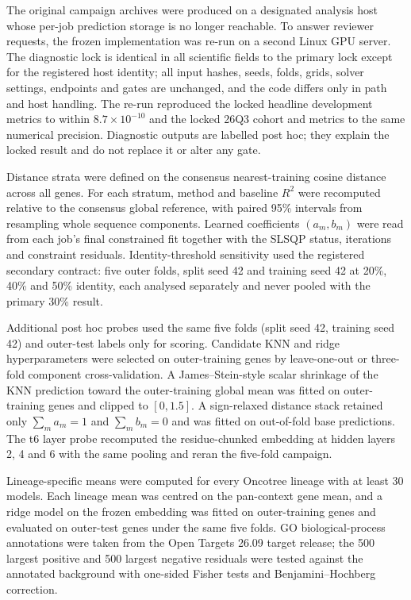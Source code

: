 \documentclass[11pt]{article}
\begin{document}
The original campaign archives were produced on a designated analysis host whose
per-job prediction storage is no longer reachable. To answer reviewer requests,
the frozen implementation was re-run on a second Linux GPU server. The diagnostic
lock is identical in all scientific fields to the primary lock except for the
registered host identity; all input hashes, seeds, folds, grids, solver settings,
endpoints and gates are unchanged, and the code differs only in path and host
handling. The re-run reproduced the locked headline development metrics to
within $8.7\times10^{-10}$ and the locked 26Q3 cohort and metrics to the same
numerical precision. Diagnostic outputs are labelled post hoc; they explain the
locked result and do not replace it or alter any gate.

Distance strata were defined on the consensus nearest-training cosine distance
across all genes. For each stratum, method and baseline $R^2$ were recomputed
relative to the consensus global reference, with paired 95\% intervals from
resampling whole sequence components. Learned coefficients $(a_m,b_m)$ were read
from each job's final constrained fit together with the SLSQP status, iterations
and constraint residuals. Identity-threshold sensitivity used the registered
secondary contract: five outer folds, split seed 42 and training seed 42 at
20\%, 40\% and 50\% identity, each analysed separately and never pooled with the
primary 30\% result.

Additional post hoc probes used the same five folds (split seed 42, training
seed 42) and outer-test labels only for scoring. Candidate KNN and ridge
hyperparameters were selected on outer-training genes by leave-one-out or
three-fold component cross-validation. A James--Stein-style scalar shrinkage of
the KNN prediction toward the outer-training global mean was fitted on
outer-training genes and clipped to $[0,1.5]$. A sign-relaxed distance stack
retained only $\sum_m a_m=1$ and $\sum_m b_m=0$ and was fitted on out-of-fold
base predictions. The t6 layer probe recomputed the residue-chunked embedding at
hidden layers 2, 4 and 6 with the same pooling and reran the five-fold campaign.

Lineage-specific means were computed for every Oncotree lineage with at least 30
models. Each lineage mean was centred on the pan-context gene mean, and a ridge
model on the frozen embedding was fitted on outer-training genes and evaluated on
outer-test genes under the same five folds. GO biological-process annotations
were taken from the Open Targets 26.09 target release; the 500 largest positive
and 500 largest negative residuals were tested against the annotated background
with one-sided Fisher tests and Benjamini--Hochberg correction.
\end{document}
